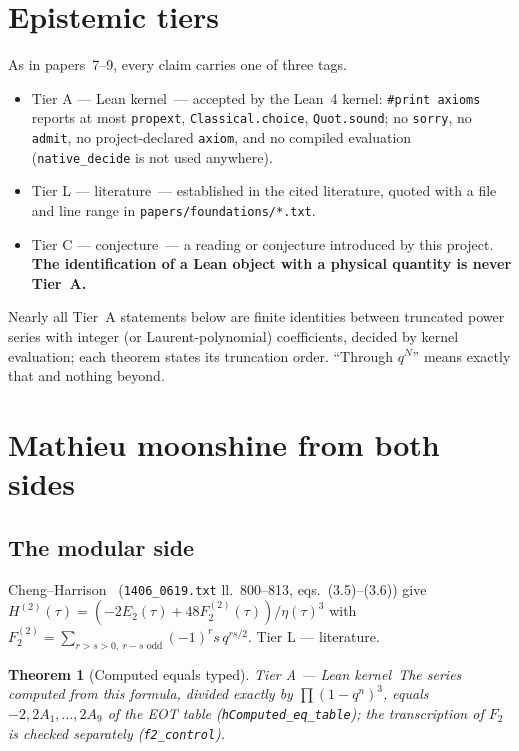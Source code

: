 \documentclass[11pt,a4paper]{article}
\newtheorem{theorem}{Theorem}[section]
\theoremstyle{remark}
\newcommand{\tierA}{\colorbox{green!15}{\textsf{\scriptsize Tier A --- Lean kernel}}}
\newcommand{\tierL}{\colorbox{blue!10}{\textsf{\scriptsize Tier L --- literature}}}
\newcommand{\tierC}{\colorbox{orange!15}{\textsf{\scriptsize Tier C --- conjecture}}}
\newcommand{\lean}[1]{\texttt{#1}}
\begin{document}
\section{Epistemic tiers}
\label{sec:tiers}
As in papers~7--9, every claim carries one of three tags.
\begin{itemize}
  \item \tierA\ --- accepted by the Lean~4 kernel: \texttt{\#print axioms} reports at most
  \texttt{propext}, \texttt{Classical.choice}, \texttt{Quot.sound}; no \texttt{sorry}, no
  \texttt{admit}, no project-declared \texttt{axiom}, and no compiled evaluation
  (\texttt{native\_decide} is not used anywhere).
  \item \tierL\ --- established in the cited literature, quoted with a file and line range in
  \texttt{papers/foundations/*.txt}.
  \item \tierC\ --- a reading or conjecture introduced by this project. \textbf{The identification of
  a Lean object with a physical quantity is never Tier~A.}
\end{itemize}
Nearly all Tier~A statements below are finite identities between truncated power series with integer
(or Laurent-polynomial) coefficients, decided by kernel evaluation; each theorem states its truncation
order. ``Through $q^N$'' means exactly that and nothing beyond.

\section{Mathieu moonshine from both sides}
\label{sec:moonshine}

\subsection{The modular side}
Cheng--Harrison~\cite{ChengHarrison2014} (\texttt{1406\_0619.txt} ll.~800--813, eqs.~(3.5)--(3.6))
give $H^{(2)}(\tau)=(-2E_2(\tau)+48F_2^{(2)}(\tau))/\eta(\tau)^3$ with
$F_2^{(2)}=\sum_{r>s>0,\ r-s\text{ odd}}(-1)^r s\,q^{rs/2}$. \tierL.

\begin{theorem}[Computed equals typed] \tierA\
The series computed from this formula, divided exactly by $\prod(1-q^n)^3$, equals
$-2,2A_1,\dots,2A_9$ of the EOT table (\lean{hComputed\_eq\_table}); the transcription of $F_2$ is
checked separately (\lean{f2\_control}).
\end{theorem}
\end{document}
